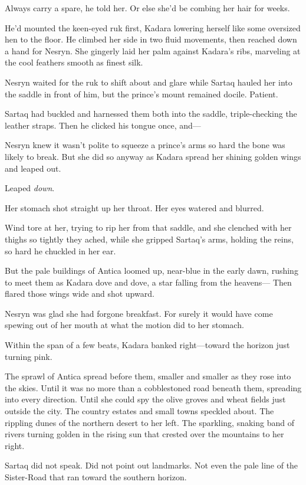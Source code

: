 Always carry a spare, he told her. Or else she'd be combing her hair for weeks.

He'd mounted the keen-eyed ruk first, Kadara lowering herself like some oversized hen to the floor. He climbed her side in two fluid movements, then reached down a hand for Nesryn. She gingerly laid her palm against Kadara's ribs, marveling at the cool feathers smooth as finest silk.

Nesryn waited for the ruk to shift about and glare while Sartaq hauled her into the saddle in front of him, but the prince's mount remained docile. Patient.

Sartaq had buckled and harnessed them both into the saddle, triple-checking the leather straps. Then he clicked his tongue once, and---

Nesryn knew it wasn't polite to squeeze a prince's arms so hard the bone was likely to break. But she did so anyway as Kadara spread her shining golden wings and leaped out.

Leaped \emph{down}.

Her stomach shot straight up her throat. Her eyes watered and blurred.

Wind tore at her, trying to rip her from that saddle, and she clenched with her thighs so tightly they ached, while she gripped Sartaq's arms, holding the reins, so hard he chuckled in her ear.

But the pale buildings of Antica loomed up, near-blue in the early dawn, rushing to meet them as Kadara dove and dove, a star falling from the heavens--- Then flared those wings wide and shot upward.

Nesryn was glad she had forgone breakfast. For surely it would have come spewing out of her mouth at what the motion did to her stomach.

Within the span of a few beats, Kadara banked right---toward the horizon just turning pink.

The sprawl of Antica spread before them, smaller and smaller as they rose into the skies. Until it was no more than a cobblestoned road beneath them, spreading into every direction. Until she could spy the olive groves and wheat fields just outside the city. The country estates and small towns speckled about. The rippling dunes of the northern desert to her left. The sparkling, snaking band of rivers turning golden in the rising sun that crested over the mountains to her right.

Sartaq did not speak. Did not point out landmarks. Not even the pale line of the Sister-Road that ran toward the southern horizon.

